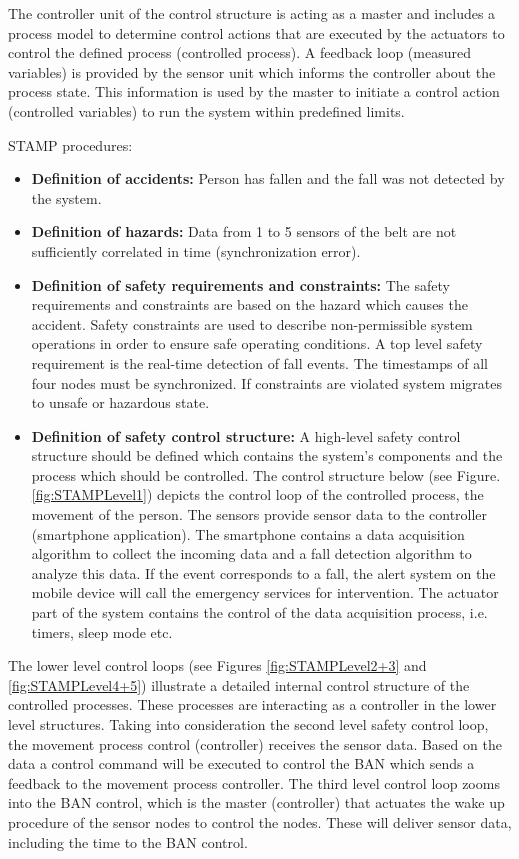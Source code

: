 \documentclass[10pt,journal,compsoc]{IEEEtran}
\begin{document}
The controller unit of the control structure is acting as a master and includes a process model to determine control actions that are executed by the actuators to control the defined process (controlled process). A feedback loop (measured variables) is provided by the sensor unit which informs the controller about the process state. This information is used by the master to initiate a control action (controlled variables) to run the system within predefined limits. 

STAMP procedures:

\begin{itemize}
	\item \textbf{Definition of accidents:} Person has fallen and the fall was not detected by the system.
	\item \textbf{Definition of hazards:} Data from 1 to 5 sensors of the belt are not sufficiently correlated in time (synchronization error).
	\item \textbf{Definition of safety requirements and constraints:} The safety requirements and constraints are based on the hazard which causes the accident. Safety constraints are used to describe non-permissible system operations in order to ensure safe operating conditions. A top level safety requirement is the real-time detection of fall events. The timestamps of all four nodes must be synchronized. If constraints are violated system migrates to unsafe or hazardous state.
	\item \textbf{Definition of safety control structure:}
	A high-level safety control structure should be defined which contains the system's components and the process which should be controlled. The control structure below (see Figure. \ref{fig:STAMPLevel1}) depicts the control loop of the controlled process, the movement of the person.
	The sensors provide sensor data to the controller (smartphone application). The smartphone contains a data acquisition algorithm to collect the incoming data and a fall detection algorithm to analyze this data. If the event corresponds to a fall, the alert system on the mobile device will call the emergency services for intervention. The actuator part of the system contains the control of the data acquisition process, i.e. timers, sleep mode etc.
\end{itemize}	
	The lower level control loops (see Figures \ref{fig:STAMPLevel2+3} and \ref{fig:STAMPLevel4+5}) illustrate a detailed internal control structure of the controlled processes. These processes are interacting as a controller in the lower level structures. Taking into consideration the second level safety control loop, the movement process control (controller) receives the sensor data. Based on the data a control command will be executed to control the BAN which sends a feedback to the movement process controller. The third level control loop zooms into the BAN control, which is the master (controller) that actuates the wake up procedure of the sensor nodes to control the nodes. These will deliver sensor data, including the time to the BAN control.
\end{document}
